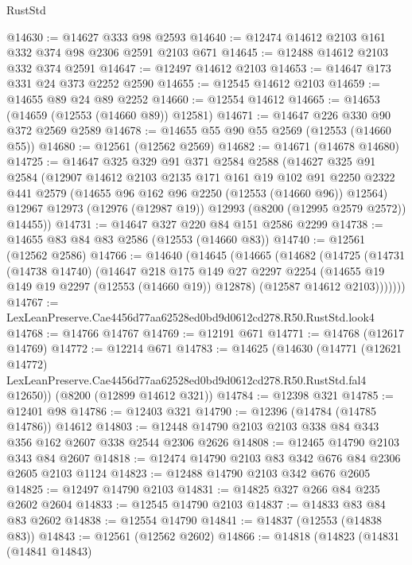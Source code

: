 \begin{lexlean}{RustStd}
\begin{coremodule}
@14630 := @14627 @333 @98 @2593
@14640 := @12474 @14612 @2103 @161 @332 @374 @98 @2306 @2591 @2103 @671
@14645 := @12488 @14612 @2103 @332 @374 @2591
@14647 := @12497 @14612 @2103
@14653 := @14647 @173 @331 @24 @373 @2252 @2590
@14655 := @12545 @14612 @2103
@14659 := @14655 @89 @24 @89 @2252
@14660 := @12554 @14612
@14665 := @14653 (@14659 (@12553 (@14660 @89)) @12581)
@14671 := @14647 @226 @330 @90 @372 @2569 @2589
@14678 := @14655 @55 @90 @55 @2569 (@12553 (@14660 @55))
@14680 := @12561 (@12562 @2569)
@14682 := @14671 (@14678 @14680)
@14725 := @14647
    @325
    @329
    @91
    @371
    @2584
    @2588
    (@14627
      @325
      @91
      @2584
      (@12907
        @14612
        @2103
        @2135
        @171
        @161
        @19
        @102
        @91
        @2250
        @2322
        @441
        @2579
        (@14655 @96 @162 @96 @2250 (@12553 (@14660 @96)) @12564)
        @12967
        @12973
        (@12976 (@12987 @19))
        @12993
        (@8200 (@12995 @2579 @2572))
        @14455))
@14731 := @14647 @327 @220 @84 @151 @2586 @2299
@14738 := @14655 @83 @84 @83 @2586 (@12553 (@14660 @83))
@14740 := @12561 (@12562 @2586)
@14766 := @14640
    (@14645
      (@14665
        (@14682
          (@14725
            (@14731
              (@14738 @14740)
              (@14647
                @218
                @175
                @149
                @27
                @2297
                @2254
                (@14655 @19 @149 @19 @2297 (@12553 (@14660 @19)) @12878)
                (@12587 @14612 @2103)))))))
@14767 := LexLeanPreserve.Cae4456d77aa62528ed0bd9d0612cd278.R50.RustStd.look4
@14768 := @14766 @14767
@14769 := @12191 @671
@14771 := @14768 (@12617 @14769)
@14772 := @12214 @671
@14783 := @14625
    (@14630
      (@14771
        (@12621 @14772)
        LexLeanPreserve.Cae4456d77aa62528ed0bd9d0612cd278.R50.RustStd.fal4
        @12650))
    (@8200 (@12899 @14612 @321))
@14784 := @12398 @321
@14785 := @12401 @98
@14786 := @12403 @321
@14790 := @12396 (@14784 (@14785 @14786)) @14612
@14803 := @12448 @14790 @2103 @2103 @338 @84 @343 @356 @162 @2607 @338 @2544 @2306 @2626
@14808 := @12465 @14790 @2103 @343 @84 @2607
@14818 := @12474 @14790 @2103 @83 @342 @676 @84 @2306 @2605 @2103 @1124
@14823 := @12488 @14790 @2103 @342 @676 @2605
@14825 := @12497 @14790 @2103
@14831 := @14825 @327 @266 @84 @235 @2602 @2604
@14833 := @12545 @14790 @2103
@14837 := @14833 @83 @84 @83 @2602
@14838 := @12554 @14790
@14841 := @14837 (@12553 (@14838 @83))
@14843 := @12561 (@12562 @2602)
@14866 := @14818
    (@14823
      (@14831
        (@14841 @14843)

\end{coremodule}
\end{lexlean}
